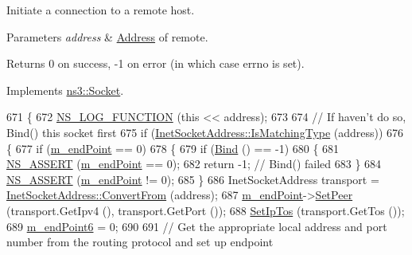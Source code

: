 Initiate a connection to a remote host. 


\begin{DoxyParams}{Parameters}
{\em address} & \hyperlink{classns3_1_1Address}{Address} of remote. \\
\hline
\end{DoxyParams}
\begin{DoxyReturn}{Returns}
0 on success, -\/1 on error (in which case errno is set). 
\end{DoxyReturn}


Implements \hyperlink{classns3_1_1Socket_a97f08aaf37b8fd7d4b5cad4dfdd4022a}{ns3\+::\+Socket}.


\begin{DoxyCode}
671 \{
672   \hyperlink{log-macros-disabled_8h_a90b90d5bad1f39cb1b64923ea94c0761}{NS\_LOG\_FUNCTION} (\textcolor{keyword}{this} << address);
673 
674   \textcolor{comment}{// If haven't do so, Bind() this socket first}
675   \textcolor{keywordflow}{if} (\hyperlink{classns3_1_1InetSocketAddress_a9426766e34e928ce5dbdbeb9563a10df}{InetSocketAddress::IsMatchingType} (address))
676     \{
677       \textcolor{keywordflow}{if} (\hyperlink{classns3_1_1TcpSocketBase_a78a4181c0a7394749110ea6b194de467}{m\_endPoint} == 0)
678         \{
679           \textcolor{keywordflow}{if} (\hyperlink{classns3_1_1TcpSocketBase_a7a9a87b74c1ce59ac89df8d9221681dd}{Bind} () == -1)
680             \{
681               \hyperlink{assert_8h_a6dccdb0de9b252f60088ce281c49d052}{NS\_ASSERT} (\hyperlink{classns3_1_1TcpSocketBase_a78a4181c0a7394749110ea6b194de467}{m\_endPoint} == 0);
682               \textcolor{keywordflow}{return} -1; \textcolor{comment}{// Bind() failed}
683             \}
684           \hyperlink{assert_8h_a6dccdb0de9b252f60088ce281c49d052}{NS\_ASSERT} (\hyperlink{classns3_1_1TcpSocketBase_a78a4181c0a7394749110ea6b194de467}{m\_endPoint} != 0);
685         \}
686       InetSocketAddress transport = \hyperlink{classns3_1_1InetSocketAddress_ade776b1109e7b9a7be0b22ced49931e3}{InetSocketAddress::ConvertFrom} (address);
687       \hyperlink{classns3_1_1TcpSocketBase_a78a4181c0a7394749110ea6b194de467}{m\_endPoint}->\hyperlink{classns3_1_1Ipv4EndPoint_aa83bdb487bea8b5d9643c3f2efd0289f}{SetPeer} (transport.GetIpv4 (), transport.GetPort ());
688       \hyperlink{classns3_1_1Socket_a2a21a2d166ec2adf766b84d984d1cf65}{SetIpTos} (transport.GetTos ());
689       \hyperlink{classns3_1_1TcpSocketBase_ab4b114c3959ee672b4fc9b7a90540dba}{m\_endPoint6} = 0;
690 
691       \textcolor{comment}{// Get the appropriate local address and port number from the routing protocol and set up endpoint}

\end{DoxyCode}
